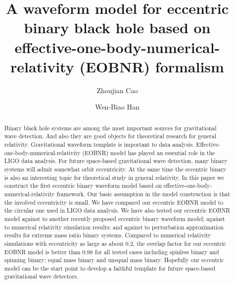 \documentclass[prd,aps,a4paper,superscriptaddress,twocolumn,footinbib,showpacs]{revtex4}
\begin{document}
\title{A waveform model for eccentric binary black hole based on effective-one-body-numerical-relativity (EOBNR) formalism}

\author{Zhoujian Cao}
 
\author{Wen-Biao Han}

\begin{abstract}
Binary black hole systems are among the most important sources for gravitational wave detection. And also they
are good objects for theoretical research for general relativity. Gravitational waveform template is important to data analysis. Effective-one-body-numerical-relativity (EOBNR) model has played an essential role in the LIGO data analysis. For future space-based gravitational wave detection, many binary systems will admit somewhat orbit eccentricity. At the same time the eccentric binary is also an interesting topic for theoretical study in general relativity. In this paper we construct the first eccentric binary waveform model based on effective-one-body-numerical-relativity framework. Our basic assumption in the model construction is that the involved eccentricity is small. We have compared our eccentric EOBNR model to the circular one used in LIGO data analysis. We have also tested our eccentric EOBNR model against to another recently proposed eccentric binary waveform model; against to numerical relativity simulation results; and against to perturbation approximation results for extreme mass ratio binary systems. Compared to numerical relativity simulations with eccentricity as large as about 0.2, the overlap factor for our eccentric EOBNR model is better than 0.98 for all tested cases including spinless binary and spinning binary; equal mass binary and unequal mass binary. Hopefully our eccentric model can be the start point to develop a faithful template for future space-based gravitational wave detectors.
\end{abstract}

\end{document}
